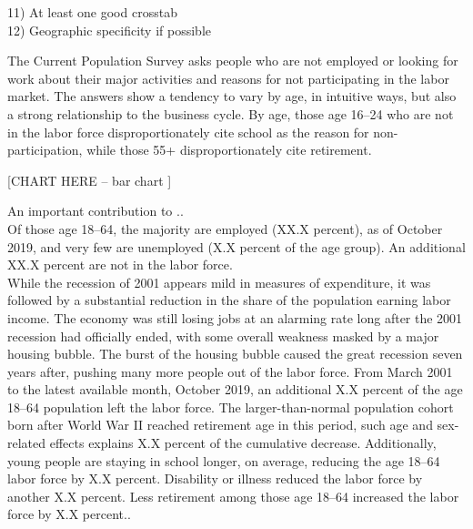 \documentclass{report}
\begin{document}
{{{{\begin{minipage}{0.76\textwidth}
11) At least one good crosstab \\

12) Geographic specificity if possible


\end{minipage}


\newpage


\begin{minipage}{0.76\textwidth}

\small The Current Population Survey asks people who are not employed or looking for work about their major activities and reasons for not participating in the labor market. The answers show a tendency to vary by age, in intuitive ways, but also a strong relationship to the business cycle. By age, those age 16--24 who are not in the labor force disproportionately cite school as the reason for non-participation, while those 55+ disproportionately cite retirement. \\

\vspace{2mm}

\normalsize

[CHART HERE -- bar chart ]\\

\vspace{2mm}

\small An important contribution to .. \\

Of those age 18--64, the majority are employed (XX.X percent), as of October 2019, and very few are unemployed (X.X percent of the age group). An additional XX.X percent are not in the labor force. \\

While the recession of 2001 appears mild in measures of expenditure, it was followed by a substantial reduction in the share of the population earning labor income. The economy was still losing jobs at an alarming rate long after the 2001 recession had officially ended, with some overall weakness masked by a major housing bubble. The burst of the housing bubble caused the great recession seven years after, pushing many more people out of the labor force. From March 2001 to the latest available month, October 2019, an additional X.X percent of the age 18--64 population left the labor force. The larger-than-normal population cohort born after World War II reached retirement age in this period, such age and sex-related effects explains X.X percent of the cumulative decrease. Additionally, young people are staying in school longer, on average, reducing the age 18--64 labor force by X.X percent. Disability or illness reduced the labor force by another X.X percent. Less retirement among those age 18--64 increased the labor force by X.X percent.. \\


\end{minipage}}}}}
\end{document}
